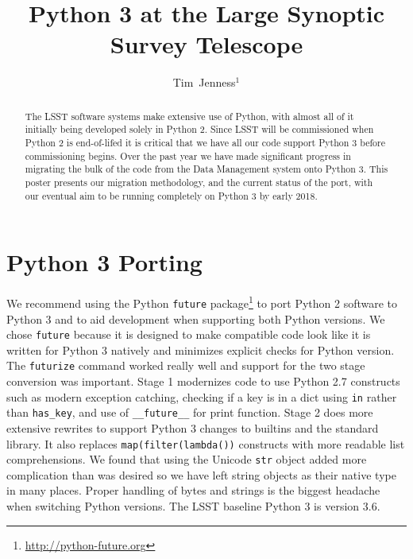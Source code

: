 \documentclass[11pt,twoside]{article}
\begin{document}
\title{Python 3 at the Large Synoptic Survey Telescope}

\author{Tim~Jenness$^1$
}


\begin{abstract}
  The LSST software systems make extensive use of Python, with almost all of it initially being developed solely in Python 2.
  Since LSST will be commissioned when Python 2 is end-of-lifed it is critical that we have all our code support Python 3 before commissioning begins.
  Over the past year we have made significant progress in migrating the bulk of the code from the Data Management system onto Python 3.
  This poster presents our migration methodology, and the current status of the port, with our eventual aim to be running completely on Python 3 by early 2018.
\end{abstract}

\section{Python 3 Porting}

We recommend using the Python \verb|future| package\footnote{\url{http://python-future.org}} to port Python 2 software to Python 3 and to aid development when supporting both Python versions.
We chose \verb|future| because it is designed to make compatible code look like it is written for Python 3 natively and minimizes explicit checks for Python version.
The \verb|futurize| command worked really well and support for the two stage conversion was important.
Stage 1 modernizes code to use Python 2.7 constructs such as modern exception catching, checking if a key is in a dict using \verb|in| rather than \verb|has_key|, and use of \verb|__future__| for print function.
Stage 2 does more extensive rewrites to support Python 3 changes to builtins and the standard library.
It also replaces \verb|map(filter(lambda())| constructs with more readable list comprehensions.
We found that using the Unicode \verb|str| object added more complication than was desired so we have left string objects as their native type in many places.
Proper handling of bytes and strings is the biggest headache when switching Python versions.
The LSST baseline Python 3 is version 3.6.
\end{document}
